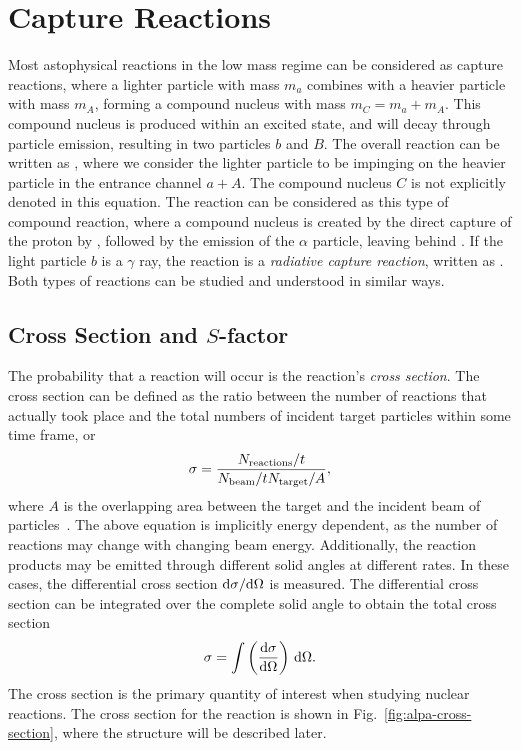 
\section{Capture Reactions}

Most astophysical reactions in the low mass regime can be considered as capture
reactions, where a lighter particle with mass $m_a$ combines with a heavier
particle with mass $m_A$, forming a compound nucleus with mass
$m_C = m_a + m_A$. This compound nucleus is produced within an excited state,
and will decay through particle emission, resulting in two particles $b$ and
$B$. The overall reaction can be written as , where we
consider the lighter particle to be impinging on the heavier particle in the
entrance channel $a + A$. The compound nucleus $C$ is not explicitly denoted
in this equation. The reaction \alpa{} can be considered as this type of
compound reaction, where a compound nucleus  is created by the
direct capture of the proton by , followed by the emission of the
$\alpha$ particle, leaving behind . If the light particle $b$ is a
$\gamma$ ray, the reaction is a \emph{radiative capture reaction}, written as
. Both types of reactions can be studied and understood in
similar ways.

\subsection{Cross Section and $S$-factor}

The probability that a reaction will occur is the reaction's
\emph{cross section}. The cross section can be defined as the ratio between the
number of reactions that actually took place and the total numbers of incident
target particles within some time frame, or
\[
    \sigma = \frac{N_{\rm{reactions}} / t}{N_{\rm{beam}} / t N_{\rm{target}} / A},
\]
where $A$ is the overlapping area between the target and the incident beam of
particles~\cite{Iliadis}. The above equation is implicitly energy dependent, as
the number of reactions may change with changing beam energy. Additionally, the
reaction products may be emitted through different solid angles at different
rates. In these cases, the differential cross section
$\rm{d}\sigma/\rm{d}\Omega$ is measured. The differential cross section can be
integrated over the complete solid angle to obtain the total cross section
\[
    \sigma = \int \left(\frac{\rm{d}\sigma}{\rm{d}\Omega}\right)\,\rm{d}\Omega.
\]
The cross section is the primary quantity of interest when studying nuclear
reactions. The cross section for the \alpa{} reaction is shown in
Fig.~\ref{fig:alpa-cross-section}, where the structure will be described later.

